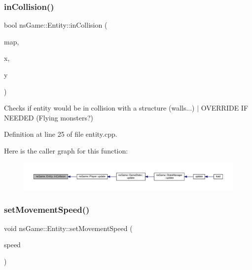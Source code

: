 \subsubsection{\texorpdfstring{in\+Collision()}{inCollision()}}
{\footnotesize\ttfamily bool ns\+Game\+::\+Entity\+::in\+Collision (\begin{DoxyParamCaption}\item[{\hyperlink{type_8h_a64a592133575ccebb1b36453acbec02b}{C\+Mat}}]{map,  }\item[{unsigned}]{x,  }\item[{unsigned}]{y }\end{DoxyParamCaption})}



Checks if entity would be in collision with a structure (walls...) $\vert$ O\+V\+E\+R\+R\+I\+DE IF N\+E\+E\+D\+ED (Flying monsters?) 



Definition at line 25 of file entity.\+cpp.

Here is the caller graph for this function\+:\nopagebreak
\begin{figure}[H]
\begin{center}
\leavevmode
\includegraphics[width=350pt]{classns_game_1_1_entity_a5dd00624fa76be09de80a6d2a982ea09_icgraph}
\end{center}
\end{figure}
\mbox{\label{classns_game_1_1_entity_a0254c30b6223caa723303266ad04e4cd}} 
\subsubsection{\texorpdfstring{set\+Movement\+Speed()}{setMovementSpeed()}}
{\footnotesize\ttfamily void ns\+Game\+::\+Entity\+::set\+Movement\+Speed (\begin{DoxyParamCaption}\item[{double}]{speed }\end{DoxyParamCaption})\hspace{0.3cm}{\ttfamily [virtual]}}



